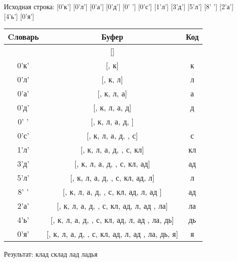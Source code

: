 \documentclass[a4paper, 12pt]{article}
\begin{document}
Исходная строка: [0'к'] [0'л'] [0'а'] [0'д'] [0' '] [0'с'] [1'л'] [3'д'] [5'л'] [8' '] [2'а'] [4'ь'] [0'я']\\
\begin{table}[h!]
\centering
\begin{tabular}{|c|c|c|}
\hline
 Cловарь & Буфер & Код  \\ \hline
 & [] & 
\\ \hline
0'к' & [, к] & к
\\ \hline
0'л' & [, к, л] & л
\\ \hline
0'а' & [, к, л, а] & а
\\ \hline
0'д' & [, к, л, а, д] & д
\\ \hline
0' ' & [, к, л, а, д,  ] &  
\\ \hline
0'с' & [, к, л, а, д,  , с] & с
\\ \hline
1'л' & [, к, л, а, д,  , с, кл] & кл
\\ \hline
3'д' & [, к, л, а, д,  , с, кл, ад] & ад
\\ \hline
5'л' & [, к, л, а, д,  , с, кл, ад,  л] &  л
\\ \hline
8' ' & [, к, л, а, д,  , с, кл, ад,  л, ад ] & ад 
\\ \hline
2'а' & [, к, л, а, д,  , с, кл, ад,  л, ад , ла] & ла
\\ \hline
4'ь' & [, к, л, а, д,  , с, кл, ад,  л, ад , ла, дь] & дь
\\ \hline
0'я' & [, к, л, а, д,  , с, кл, ад,  л, ад , ла, дь, я] & я
\\ \hline
\end{tabular}
\end{table}

Результат: клад склад лад ладья
\pagebreak
\end{document}
